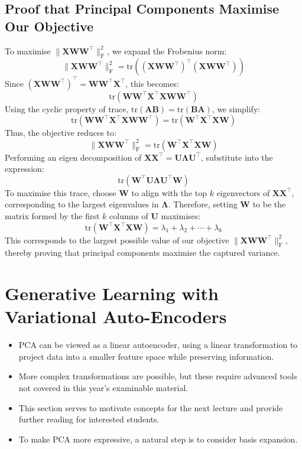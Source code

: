 \subsection{Proof that Principal Components Maximise Our Objective}

To maximise $\| \bm{X}\bm{W}\bm{W}^\top \|_{\mathrm{F}}^{2}$, we expand the Frobenius norm:
\[
    \| \bm{X}\bm{W}\bm{W}^\top \|_{\mathrm{F}}^{2} = \mathrm{tr}\left( (\bm{X}\bm{W}\bm{W}^\top)^\top (\bm{X}\bm{W}\bm{W}^\top) \right)
\]
Since $(\bm{X}\bm{W}\bm{W}^\top)^\top = \bm{W}\bm{W}^\top \bm{X}^\top$, this becomes:
\[
    \mathrm{tr}(\bm{W}\bm{W}^\top \bm{X}^\top \bm{X} \bm{W}\bm{W}^\top)
\]
Using the cyclic property of trace, $\mathrm{tr}(\mathbf{AB}) = \mathrm{tr}(\mathbf{BA})$, we simplify:
\[
    \mathrm{tr}(\bm{W}\bm{W}^\top \bm{X}^\top \bm{X} \bm{W}\bm{W}^\top) = \mathrm{tr}(\bm{W}^\top \bm{X}^\top \bm{X} \bm{W})
\]
Thus, the objective reduces to:
\[
    \| \bm{X}\bm{W}\bm{W}^\top \|_{\mathrm{F}}^{2} = \mathrm{tr}(\bm{W}^\top \bm{X}^\top \bm{X} \bm{W})
\]
Performing an eigen decomposition of $\bm{X}\bm{X}^\top = \bm{U} \bm{\Lambda} \bm{U}^\top$, substitute into the expression:
\[
    \mathrm{tr}(\bm{W}^\top \bm{U} \bm{\Lambda} \bm{U}^\top \bm{W})
\]
To maximise this trace, choose $\bm{W}$ to align with the top $k$ eigenvectors of $\bm{X}\bm{X}^\top$, corresponding to the largest eigenvalues in $\bm{\Lambda}$. Therefore, setting $\bm{W}$ to be the matrix formed by the first $k$ columns of $\bm{U}$ maximises:
\[
    \mathrm{tr}(\bm{W}^\top \bm{X}^\top \bm{X} \bm{W}) = \lambda_{1} + \lambda_{2} + \cdots + \lambda_{k}
\]
This corresponds to the largest possible value of our objective $\| \bm{X}\bm{W}\bm{W}^\top \|_{\mathrm{F}}^{2}$, thereby proving that principal components maximise the captured variance.

\section{Generative Learning with Variational Auto-Encoders}

\begin{itemize}
    \item PCA can be viewed as a linear autoencoder, using a linear transformation to project data into a smaller feature space while preserving information.
    \item More complex transformations are possible, but these require advanced tools not covered in this year’s examinable material.
    \item This section serves to motivate concepts for the next lecture and provide further reading for interested students.
    \item To make PCA more expressive, a natural step is to consider basis expansion.
\end{itemize}



